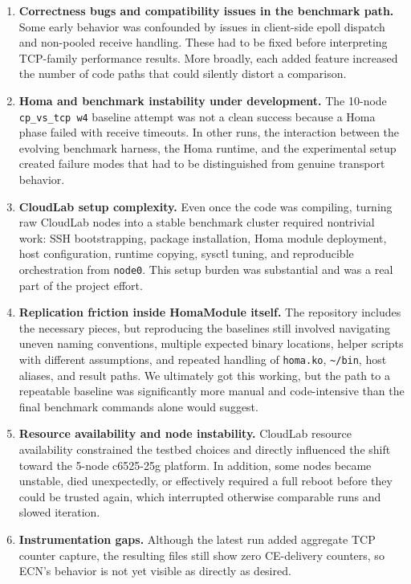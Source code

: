 \documentclass[11pt]{article}
\begin{document}
\begin{enumerate}[leftmargin=1.5em]
  \item \textbf{Correctness bugs and compatibility issues in the benchmark path.} Some early behavior was confounded by issues in client-side epoll dispatch and non-pooled receive handling. These had to be fixed before interpreting TCP-family performance results. More broadly, each added feature increased the number of code paths that could silently distort a comparison.
  \item \textbf{Homa and benchmark instability under development.} The 10-node \texttt{cp\_vs\_tcp w4} baseline attempt was not a clean success because a Homa phase failed with receive timeouts. In other runs, the interaction between the evolving benchmark harness, the Homa runtime, and the experimental setup created failure modes that had to be distinguished from genuine transport behavior.
  \item \textbf{CloudLab setup complexity.} Even once the code was compiling, turning raw CloudLab nodes into a stable benchmark cluster required nontrivial work: SSH bootstrapping, package installation, Homa module deployment, host configuration, runtime copying, sysctl tuning, and reproducible orchestration from \texttt{node0}. This setup burden was substantial and was a real part of the project effort.
  \item \textbf{Replication friction inside HomaModule itself.} The repository includes the necessary pieces, but reproducing the baselines still involved navigating uneven naming conventions, multiple expected binary locations, helper scripts with different assumptions, and repeated handling of \texttt{homa.ko}, \texttt{\textasciitilde/bin}, host aliases, and result paths. We ultimately got this working, but the path to a repeatable baseline was significantly more manual and code-intensive than the final benchmark commands alone would suggest.
  \item \textbf{Resource availability and node instability.} CloudLab resource availability constrained the testbed choices and directly influenced the shift toward the 5-node c6525-25g platform. In addition, some nodes became unstable, died unexpectedly, or effectively required a full reboot before they could be trusted again, which interrupted otherwise comparable runs and slowed iteration.
  \item \textbf{Instrumentation gaps.} Although the latest run added aggregate TCP counter capture, the resulting files still show zero CE-delivery counters, so ECN's behavior is not yet visible as directly as desired.

\end{enumerate}
\end{document}
